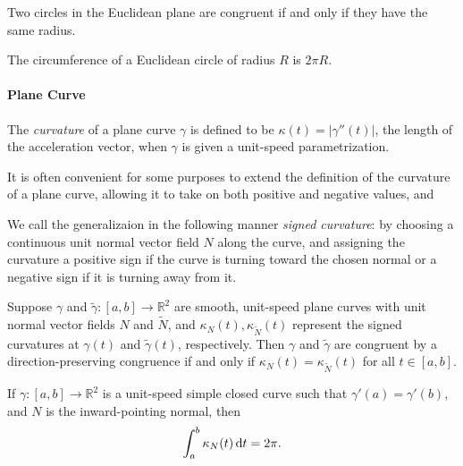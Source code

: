 \begin{theorem}
  \label{theorem-circle-classification}
  Two circles in the Euclidean plane are congruent if and only if they have the same radius.
\end{theorem}

\begin{theorem}
  \label{theorem-circumference}
  The circumference of a Euclidean circle of radius \( R \) is \( 2 \pi R \).
\end{theorem}

\paragraph{Plane Curve}

\begin{definition}
  \label{definition-curvature-plane-curve}
     The \emph{curvature} of a plane curve \( \gamma \) is defined to be \( \kappa(t) = \left\lvert \gamma''(t) \right\rvert \), the length of the acceleration vector, when \( \gamma \) is given a unit-speed parametrization.
\end{definition}
It is often convenient for some purposes to extend the definition of the curvature of a plane curve, allowing it to take on both positive and negative values, and \begin{definition}
  \label{definition-signed-curvature-plane-curve}
  We call the generalizaion in the following manner \emph{signed curvature}: 
  by choosing a continuous unit normal vector field \( N \) along the curve, and assigning the curvature a positive sign if the curve is turning toward the chosen normal or a negative sign if it is turning away from it.
\end{definition}

\begin{theorem}
  \label{theorem-plane-curve-classification}
  Suppose \( \gamma \) and \( \tilde{\gamma}: [a, b] \to \mathbb{R}^2 \) are smooth, unit-speed plane curves with unit normal vector fields \( N \) and \( \tilde{N} \), and \( \kappa_N(t), \kappa_{\tilde{N}}(t) \) represent the signed curvatures at \( \gamma(t) \) and \( \tilde{\gamma}(t) \), respectively.
  Then \( \gamma \) and \( \tilde{\gamma} \) are congruent by a direction-preserving congruence if and only if \( \kappa_N(t) = \kappa_{\tilde{N}}(t) \) for all \( t \in [a, b] \).
\end{theorem}

\begin{theorem}
  \label{theorem-total-curvature}
  If \( \gamma:[a, b] \to \mathbb{R}^2 \) is a unit-speed simple closed curve such that \( \gamma'(a) = \gamma'(b) \), and \( N \) is the inward-pointing normal, then
  \[
    \int_a^b \kappa_N(t) \mathop{}\!\mathrm{d} t = 2 \pi.
  \]
\end{theorem}

